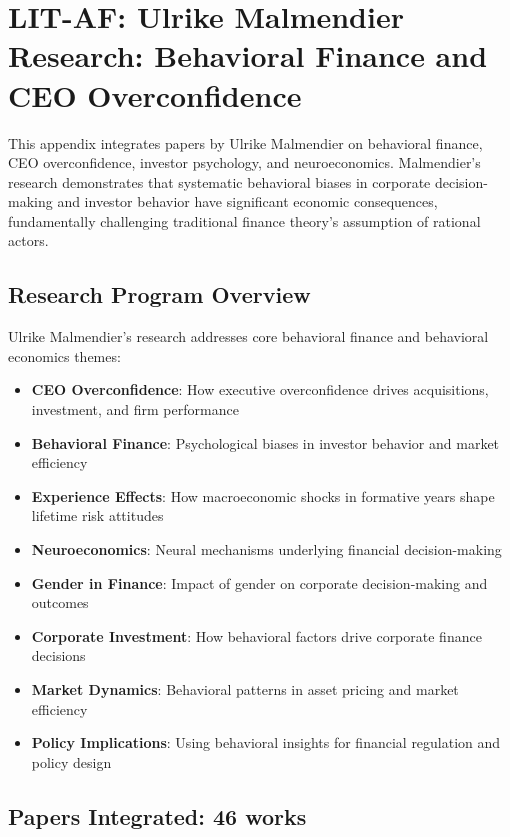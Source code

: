 
\section{LIT-AF: Ulrike Malmendier Research: Behavioral Finance and CEO Overconfidence}
\label{app:litaf}

This appendix integrates papers by Ulrike Malmendier on behavioral finance, CEO overconfidence, investor psychology, and neuroeconomics. Malmendier's research demonstrates that systematic behavioral biases in corporate decision-making and investor behavior have significant economic consequences, fundamentally challenging traditional finance theory's assumption of rational actors.

\subsection{Research Program Overview}

Ulrike Malmendier's research addresses core behavioral finance and behavioral economics themes:

\begin{itemize}
  \item \textbf{CEO Overconfidence}: How executive overconfidence drives acquisitions, investment, and firm performance
  \item \textbf{Behavioral Finance}: Psychological biases in investor behavior and market efficiency
  \item \textbf{Experience Effects}: How macroeconomic shocks in formative years shape lifetime risk attitudes
  \item \textbf{Neuroeconomics}: Neural mechanisms underlying financial decision-making
  \item \textbf{Gender in Finance}: Impact of gender on corporate decision-making and outcomes
  \item \textbf{Corporate Investment}: How behavioral factors drive corporate finance decisions
  \item \textbf{Market Dynamics}: Behavioral patterns in asset pricing and market efficiency
  \item \textbf{Policy Implications}: Using behavioral insights for financial regulation and policy design
\end{itemize}

\subsection{Papers Integrated: 46 works}


